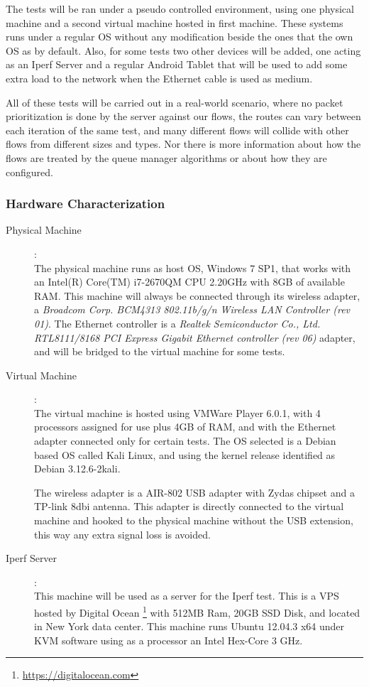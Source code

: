 The tests will be ran under a pseudo controlled environment, using one
physical  machine and a second virtual machine hosted in first machine. These
systems runs under a regular OS without any modification beside the ones that
the own OS as by default. Also, for some tests two other devices will be
added,  one acting as an Iperf Server and a regular Android Tablet that will
be used to add some extra load to the network when the Ethernet cable is used
as medium.

All of these tests will be carried out in a real-world scenario, where no
packet  prioritization is done by the server against our flows, the routes can
vary between each iteration of the same test, and many different flows will
collide with other flows from different sizes and types. Nor there is more
information about how the flows are treated by the queue manager algorithms or
about how they are  configured.

\subsubsection{Hardware Characterization}

\begin{description}

\item [Physical Machine]: \hfill \\
The physical machine runs as host OS, Windows 7 SP1, that works with an Intel(R)
Core(TM) i7-2670QM CPU \@ 2.20GHz with 8GB of available RAM. This machine will 
always be connected through its wireless adapter, a \textit{Broadcom Corp. 
BCM4313 802.11b/g/n Wireless LAN Controller (rev 01)}. The Ethernet controller 
is a \textit{Realtek Semiconductor Co., Ltd. RTL8111/8168 PCI Express Gigabit 
Ethernet controller (rev 06)} adapter, and will be bridged to the virtual 
machine for some tests.

\item[Virtual Machine]: \hfill \\
The virtual machine is hosted using VMWare Player 6.0.1, with 4 processors 
assigned for use plus 4GB of RAM, and with the Ethernet adapter connected only
for certain tests. The OS selected is a Debian based OS called Kali Linux, and
using the kernel release identified as Debian 3.12.6-2kali.

The wireless adapter is a AIR-802 USB adapter with Zydas chipset and a TP-link
8dbi antenna. This adapter is directly connected to the virtual machine and
hooked to the physical machine without the USB extension, this way any extra
signal  loss is avoided. 

\item[Iperf Server]: \hfill \\
This machine will be used as a server for the Iperf test. This is a VPS hosted
by Digital Ocean \footnote{\url{https://digitalocean.com}} with 512MB Ram,
20GB SSD Disk, and located in New York data center. This machine runs Ubuntu
12.04.3 x64 under KVM software using as a processor an Intel Hex-Core 3 GHz.

\end{description}


